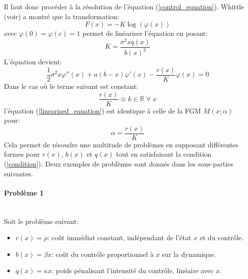 Il faut donc procéder à la résolution de l'équation (\ref{control_equation}). Whittle (voir\cite{whittle1982}) a montré que la transformation: 
\[F(x)=-K\log(\varphi(x))\]
avec $\varphi(0)=\varphi(c)=1$ permet de linéariser l'équation en posant:
\[
K=\frac{\sigma^2xq(x)}{{b(x)}^2}
\]
L'équation devient:
\begin{equation}\label{linearised_equation}
    \frac{1}{2}\sigma^2 x\varphi''(x) + a(b - x)\varphi'(x) - \frac{r(x)}{K}\varphi(x) = 0
\end{equation}
Dans le cas où le terme suivant est constant:
\begin{equation}\label{condition}
    \frac{r(x)}{K}\equiv k\in\mathds{R}\;\forall\;x
\end{equation}
l'équation (\ref{linearised_equation}) est identique à celle de la \acl{FGM} $M(x;\alpha)$ pour:
\[
\alpha=\frac{r(x)}{K}
\]
Cela permet de résoudre une multitude de problèmes en supposant différentes formes pour $r(x)$, $b(x)$ et $q(x)$ tout en satisfaisant la condition (\ref{condition}). 
Deux exemples de problèmes sont donnés dans les sous-parties suivantes.

\paragraph{Problème 1}\label{p1}\phantom{}\\
\noindent Soit le problème suivant: 
\begin{itemize}
    \item $r(x) = \rho$: coût immédiat constant, indépendant de l'état $x$ et du contrôle.
    \item $b(x) = \beta x$: coût du contrôle proportionnel à $x$ sur la dynamique.
    \item $q(x) = \kappa x$: poids pénalisant l'intensité du contrôle, linéaire avec $x$.
\end{itemize}

